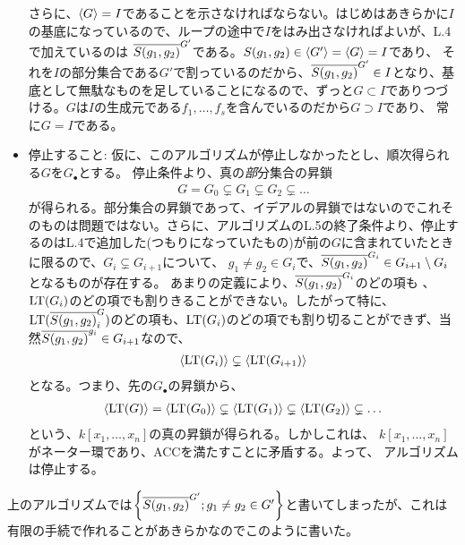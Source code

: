 \begin{myproof}
\begin{itemize}
  さらに、$\left\langle G \right\rangle = I$であることを示さなければならない。はじめはあきらかに$I$の基底になっているので、ループの途中で$I$をはみ出さなければよいが、L.4で加えているのは
  $\overline{S(g_1,g_2)}^{G'}$である。$S(g_1,g_2) \in \left\langle G' \right\rangle = \left\langle G \right\rangle = I$であり、
  それを$I$の部分集合である$G'$で割っているのだから、$\overline{S(g_1,g_2)}^{G'}\in I$となり、基底として無駄なものを足していることになるので、ずっと$G\subset I$でありつづける。$G$は$I$の生成元である$f_1,\dots,f_s$を含んでいるのだから$G\supset I$であり、
  常に$G=I$である。
  \item 停止すること:
  仮に、このアルゴリズムが停止しなかったとし、順次得られる$G$を$G_\bullet$とする。
  停止条件より、真の{\textit 部分集合の}昇鎖
  \begin{align}
    G = G_0 \subsetneq G_1 \subsetneq G_2 \subsetneq \dots
  \end{align}
  が得られる。部分集合の昇鎖であって、イデアルの昇鎖ではないのでこれそのものは問題ではない。さらに、アルゴリズムのL.5の終了条件より、停止するのはL.4で追加した(つもりになっていたもの)が前の$G$に含まれていたときに限るので、$G_i \subsetneq G_{i+1}$について、
  $g_1\neq g_2 \in G_i$で、$\overline{S(g_1,g_2)}^{G_i} \in G_{i+1}\setminus G_i$となるものが存在する。 あまりの定義により、$\overline{S(g_1,g_2)}^{G_i}$のどの項も
  、${\rm LT}(G_i)$のどの項でも割りきることができない。したがって特に、
  ${\rm LT}(\overline{S(g_1,g_2)}^{G}_i)$のどの項も、${\rm LT}(G_i)$のどの項でも割り切ることができず、当然$\overline{S(g_1,g_2)}^{g_i} \in G_{i+1}$なので、
  \begin{align}
    \left\langle {\rm LT}(G_i) \right\rangle \subsetneq \left\langle {\rm LT}(G_{i+1}) \right\rangle
  \end{align}
  となる。つまり、先の$G_\bullet$の昇鎖から、
  \begin{align}
    \left\langle {\rm LT}(G)  \right\rangle = \left\langle {\rm LT}(G_0)  \right\rangle \subsetneq \left\langle {\rm LT}(G_1) \right\rangle \subsetneq
    \left\langle {\rm LT}(G_2) \right\rangle \subsetneq \dots
  \end{align}
  という、$k[x_1,\dots,x_n]$の真の昇鎖が得られる。しかしこれは、
  $k[x_1,\dots,x_n]$がネーター環であり、ACCを満たすことに矛盾する。よって、
  アルゴリズムは停止する。
\end{itemize}
\end{myproof}

上のアルゴリズムでは$\left\{\overline{S(g_1,g_2)}^{G'} ; g_1\neq g_2 \in G'\right\}$と書いてしまったが、これは有限の手続で作れることがあきらかなのでこのように書いた。

